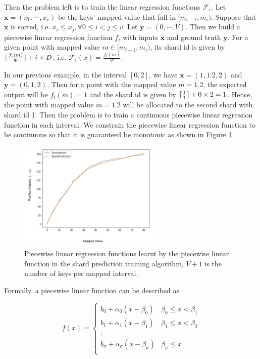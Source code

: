 Then the problem left is to train the linear regression functions $\mathcal{F}_i$. Let $\boldsymbol{x}=(x_0,\cdots,x_v)$ be the keys' mapped value that fall in $[m_{i-1}, m_i)$. Suppose that $\boldsymbol{x}$ is sorted, i.e. $x_i\leq x_j, \forall 0\leq i<j\leq v$. Let $\boldsymbol{y}=(0,\cdots, V)$. Then we build a piecewise linear regression function $f_i$ with inputs $\boldsymbol{x}$ and ground truth $\boldsymbol{y}$. For a given point with mapped value $m\in[m_{i-1}, m_i)$, its shard id is given by $\lceil\frac{f_i(m)}{\Psi}\rceil+i\times D$, i.e. $\mathcal{F}_i(x)=\frac{f_i(m)}{\Psi}$.

\begin{mscexample}
	In our previous example, in the interval $[0,2]$, we have $\boldsymbol{x}=(1,1.2,2)$ and $\boldsymbol{y}=(0,1,2)$. Then for a point with the mapped value $m=1.2$, the expected output will be $f_i(m)=1$ and the shard id is given by $\lceil\frac{1}{1}\rceil+0\times 2=1$. Hence, the point with mapped value $m=1.2$ will be allocated to the second shard with shard id 1. Then the problem is to train a continuous piecewise linear regression function in each interval. We constrain the piecewise linear regression function to be continuous so that it is guaranteed be monotonic as shown in Figure \ref{shardPrediction}.
\end{mscexample}

\begin{figure}[t]
    \centering
	\includegraphics[width=0.6\textwidth]{graphs/implementation/shardPrediction.pdf}
    \caption{Piecewise linear regression functions learnt by the piecewise linear function in the shard prediction training algorithm, $V+1$ is the number of keys per mapped interval.}
    \label{shardPrediction}
\end{figure}

Formally, a piecewise linear function can be described as 

\begin{equation}
\label{piecewise_linear_function}
	f(x)= \begin{cases} 
      b_0+\alpha_0(x-\beta_0) & \beta_0\leq x < \beta_1 \\
      b_1+\alpha_1(x-\beta_1) &  \beta_1\leq x < \beta_2 \\
      \vdots \\
      b_\sigma+\alpha_\sigma(x-\beta_\sigma) &  \beta_\sigma\leq x \\
   \end{cases}
\end{equation}

